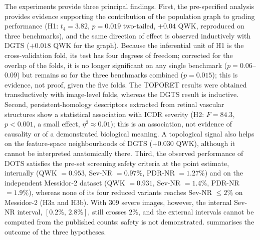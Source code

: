 The experiments provide three principal findings. First, the pre-specified analysis
provides evidence supporting the contribution of the population graph to grading
performance (H1: $t_4=3.82$, $p=0.019$ two-tailed, $+0.04$ QWK, reproduced on three
benchmarks), and the
same direction of effect is observed inductively with DGTS ($+0.018$ QWK for the
graph). Because the inferential unit of H1 is the cross-validation fold, its test has four
degrees of freedom; corrected for the overlap of the folds, it is no longer significant on
any single benchmark ($p=0.06$--$0.09$) but remains so for the three benchmarks combined
($p=0.015$); this is evidence, not proof, given the five folds. The TOPORET results were obtained transductively with image-level folds,
whereas the DGTS result is inductive. Second, persistent-homology descriptors extracted from
retinal vascular structures show a statistical association with ICDR severity (H2:
$F=84.3$, $p<0.001$, a small effect, $\eta^2\approx0.01$); this is an association, not
evidence of causality or of a demonstrated biological meaning. A topological signal also helps on the feature-space neighbourhoods
of DGTS ($+0.030$ QWK), although it cannot be interpreted anatomically there. Third, the observed performance of DOTS
satisfies the pre-set screening safety criteria at the point estimate, internally (QWK $=0.953$,
Sev-NR $=0.97\%$, PDR-NR $=1.27\%$) and on the independent Messidor-2 dataset (QWK
$=0.931$, Sev-NR $=1.4\%$, PDR-NR $=1.9\%$), whereas none of its four reduced variants
reaches Sev-NR $\leq2\%$ on Messidor-2 (H3a and H3b). With $309$ severe images, however,
the internal Sev-NR interval, $[0.2\%,\,2.8\%]$, still crosses $2\%$, and the external
intervals cannot be computed from the published counts: safety is not demonstrated.
 summarises the outcome of the three hypotheses.

